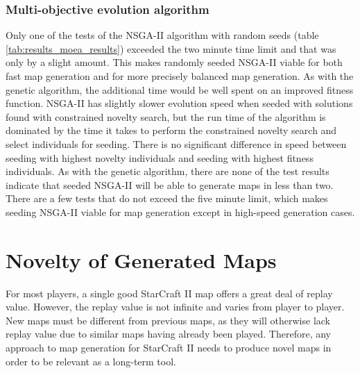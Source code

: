 \subsubsection{Multi-objective evolution algorithm}
Only one of the tests of the NSGA-II algorithm with random seeds (table \ref{tab:results_moea_results}) exceeded the two minute time limit and that was only by a slight amount. This makes randomly seeded NSGA-II viable for both fast map generation and for more precisely balanced map generation. As with the genetic algorithm, the additional time would be well spent on an improved fitness function. NSGA-II has slightly slower evolution speed when seeded with solutions found with constrained novelty search, but the run time of the algorithm is dominated by the time it takes to perform the constrained novelty search and select individuals for seeding. There is no significant difference in speed between seeding with highest novelty individuals and seeding with highest fitness individuals. As with the genetic algorithm, there are none of the test results indicate that seeded NSGA-II will be able to generate maps in less than two. There are a few tests that do not exceed the five minute limit, which makes seeding NSGA-II viable for map generation except in high-speed generation cases.

\section{Novelty of Generated Maps}
\label{discussion_novelty}
For most players, a single good StarCraft II map offers a great deal of replay value. However, the replay value is not infinite and varies from player to player. New maps must be different from previous maps, as they will otherwise lack replay value due to similar maps having already been played. Therefore, any approach to map generation for StarCraft II needs to produce novel maps in order to be relevant as a long-term tool.

